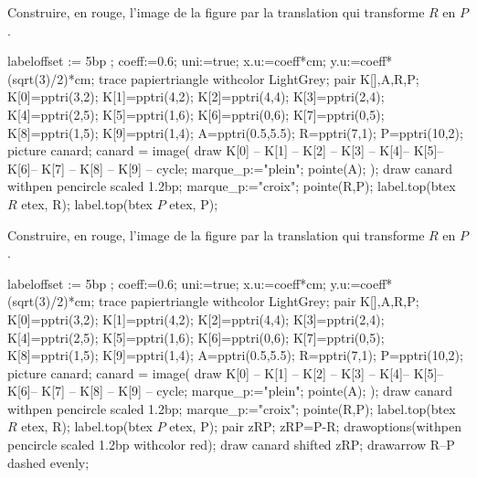 \begin{exercice*}
    Construire, en rouge, l'image de la figure par la translation qui transforme $R$ en $P$.
    \begin{Geometrie}[CoinHD={(8u,4u)}]
        labeloffset := 5bp ;
        coeff:=0.6;
        uni:=true;
        x.u:=coeff*cm;
        y.u:=coeff*(sqrt(3)/2)*cm;        
        trace papiertriangle withcolor LightGrey;
        pair K[],A,R,P;
        K[0]=pptri(3,2);
        K[1]=pptri(4,2);        
        K[2]=pptri(4,4);
        K[3]=pptri(2,4);
        K[4]=pptri(2,5);
        K[5]=pptri(1,6);
        K[6]=pptri(0,6);
        K[7]=pptri(0,5);
        K[8]=pptri(1,5);
        K[9]=pptri(1,4);
        A=pptri(0.5,5.5);
        R=pptri(7,1);
        P=pptri(10,2);
        picture canard;
        canard = image( 
            draw K[0] -- K[1] -- K[2] -- K[3] -- K[4]-- K[5]-- K[6]-- K[7] -- K[8] -- K[9] -- cycle;
            marque_p:="plein";
            pointe(A);
        );        
        draw canard withpen pencircle scaled 1.2bp;
        marque_p:="croix";
        pointe(R,P);
        label.top(btex $R$ etex, R);
        label.top(btex $P$ etex, P);
    \end{Geometrie}
\end{exercice*}
\begin{corrige}
    Construire, en rouge, l'image de la figure par la translation qui transforme $R$ en $P$.
    \begin{Geometrie}[CoinHD={(8u,4u)}]
        labeloffset := 5bp ;
        coeff:=0.6;
        uni:=true;
        x.u:=coeff*cm;
        y.u:=coeff*(sqrt(3)/2)*cm;        
        trace papiertriangle withcolor LightGrey;
        pair K[],A,R,P;
        K[0]=pptri(3,2);
        K[1]=pptri(4,2);        
        K[2]=pptri(4,4);
        K[3]=pptri(2,4);
        K[4]=pptri(2,5);
        K[5]=pptri(1,6);
        K[6]=pptri(0,6);
        K[7]=pptri(0,5);
        K[8]=pptri(1,5);
        K[9]=pptri(1,4);
        A=pptri(0.5,5.5);
        R=pptri(7,1);
        P=pptri(10,2);
        picture canard;
        canard = image( 
            draw K[0] -- K[1] -- K[2] -- K[3] -- K[4]-- K[5]-- K[6]-- K[7] -- K[8] -- K[9] -- cycle;
            marque_p:="plein";
            pointe(A);
        );        
        draw canard withpen pencircle scaled 1.2bp;
        marque_p:="croix";
        pointe(R,P);
        label.top(btex $R$ etex, R);
        label.top(btex $P$ etex, P);
        pair zRP;
        zRP=P-R;
        drawoptions(withpen pencircle scaled 1.2bp withcolor red);
        draw canard shifted zRP;
        drawarrow R--P dashed evenly;
    \end{Geometrie}
\end{corrige}

